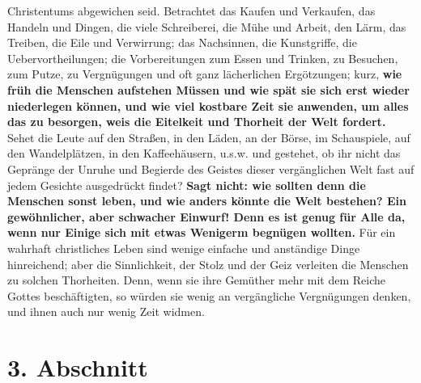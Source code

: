 Christentums abgewichen seid. Betrachtet das Kaufen und Verkaufen, das Handeln
und Dingen, die viele Schreiberei, die Mühe und Arbeit, den Lärm, das Treiben,
die Eile und Verwirrung; das Nachsinnen, die Kunstgriffe, die
Uebervortheilungen; die Vorbereitungen zum Essen und Trinken, zu Besuchen, zum
Putze, zu Vergnügungen und oft ganz lächerlichen Ergötzungen; kurz, \textbf{wie früh die
Menschen aufstehen Müssen und wie spät sie sich erst wieder niederlegen können,
und wie viel kostbare Zeit sie anwenden, um alles das zu besorgen, weis die
Eitelkeit und Thorheit der Welt fordert.} Sehet die Leute auf den Straßen, in den
Läden, an der Börse, im Schauspiele, auf den Wandelplätzen, in den
Kaffeehäusern, u.s.w. und gestehet, ob ihr nicht das Gepränge der Unruhe und
Begierde des Geistes dieser vergänglichen Welt fast auf jedem Gesichte
ausgedrückt findet? \textbf{Sagt nicht: wie sollten denn die Menschen sonst leben, und
wie anders könnte die Welt bestehen? Ein gewöhnlicher, aber schwacher Einwurf!
Denn es ist genug für Alle da, wenn nur Einige sich mit etwas Wenigerm begnügen
wollten.} Für ein wahrhaft christliches Leben sind wenige einfache und anständige
Dinge hinreichend; aber die Sinnlichkeit, der Stolz und der Geiz verleiten die
Menschen zu solchen Thorheiten. Denn, wenn sie ihre Gemüther mehr mit dem Reiche
Gottes beschäftigten, so würden sie wenig an vergängliche Vergnügungen denken,
und ihnen auch nur wenig Zeit widmen.

\section{3. Abschnitt} \label{kap15_ab3}

